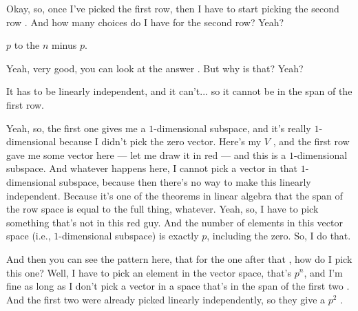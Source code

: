 \begin{proofWrapper}
\begin{speech}[01:23:29 - 01:24:12]
Okay, so, once I've picked the first row, then I have to start picking the second row . And how many choices do I have for the second row? Yeah?
\end{speech}

\begin{student}
$p$ to the $n$ minus $p$.
\end{student}

\begin{speech}[01:24:14 - 01:24:22]
Yeah, very good, you can look at the answer . But why is that? Yeah?
\end{speech}

\begin{student}
It has to be linearly independent, and it can't... so it cannot be in the span of the first row.
\end{student}

\begin{speech}[01:24:27 - 01:25:42]
Yeah, so, the first one gives me a $1$-dimensional subspace, and it's really $1$-dimensional because I didn't pick the zero vector. Here's my $V$ , and the first row gave me some vector here --- let me draw it in red  --- and this is a $1$-dimensional subspace. And whatever happens here, I cannot pick a vector in that $1$-dimensional subspace, because then there's no way to make this linearly independent. Because it's one of the theorems in linear algebra that the span of the row space is equal to the full thing, whatever. Yeah, so, I have to pick something that's not in this red guy. And the number of elements in this vector space (i.e., $1$-dimensional subspace) is exactly $p$, including the zero. So, I do that.

And then you can see the pattern here, that for the one after that , how do I pick this one? Well, I have to pick an element in the vector space, that's $p^n$, and I'm fine as long as I don't pick a vector in a space that's in the span of the first two . And the first two were already picked linearly independently, so they give a $p^2$ .


\end{speech}
\end{proofWrapper}
